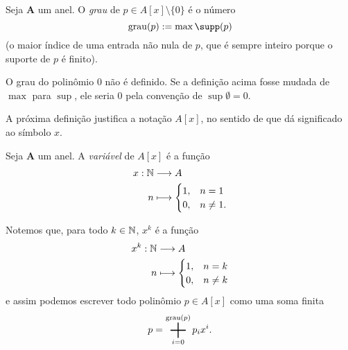 \begin{defi}
Seja $\bm A$ um anel. O \emph{grau} de $p \in A[x] \setminus \{0\}$ é o número
	\begin{equation*}
	\g(p) := \max{\supp(p)}
	\end{equation*}
(o maior índice de uma entrada não nula de $p$, que é sempre inteiro porque o suporte de $p$ é finito).
\end{defi}

O grau do polinômio $0$ não é definido. Se a definição acima fosse mudada de $\max$ para $\sup$, ele seria $0$ pela convenção de $\sup \emptyset = 0$.

A próxima definição justifica a notação $A[x]$, no sentido de que dá significado ao símbolo $x$.

\begin{defi}
Seja $\bm A$ um anel. A \emph{variável} de $A[x]$ é a função
	\begin{align*}
	{x}: {\mathbb{N}} &\longrightarrow {A} \\{n} &\longmapsto {\begin{cases}
		1,& n=1 \\
		0,& n\neq 1.
	\end{cases}}
	\end{align*}
\end{defi}

Notemos que, para todo $k \in \mathbb{N}$, $x^k$ é a função
	\begin{align*}
	{x^k}: {\mathbb{N}} &\longrightarrow {A} \\{n} &\longmapsto {\begin{cases}
		1,& n=k \\
		0,& n \neq k
	\end{cases}}
	\end{align*}
e assim podemos escrever todo polinômio $p \in A[x]$ como uma soma finita
	\begin{equation*}
	p = \sum_{i=0}^{\g(p)} p_ix^i.
	\end{equation*}



